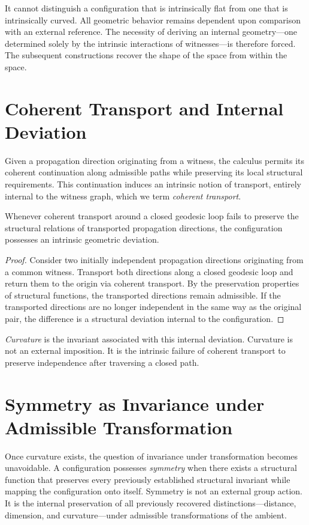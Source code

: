 \documentclass[12pt,anyside]{book}
\newcommand{\term}[1]{\textit{#1}}             %
\begin{document}
It cannot distinguish a configuration that is intrinsically flat from one that is intrinsically curved. All geometric behavior remains dependent upon comparison with an external reference. The necessity of deriving an internal geometry---one determined solely by the intrinsic interactions of witnesses---is therefore forced. The subsequent constructions recover the shape of the space from within the space.

\section{Coherent Transport and Internal Deviation}
Given a propagation direction originating from a witness, the calculus permits its coherent continuation along admissible paths while preserving its local structural requirements. This continuation induces an intrinsic notion of transport, entirely internal to the witness graph, which we term \term{coherent transport}.

\begin{theorem}
Whenever coherent transport around a closed geodesic loop fails to preserve the structural relations of transported propagation directions, the configuration possesses an intrinsic geometric deviation.
\end{theorem}

\begin{proof}
Consider two initially independent propagation directions originating from a common witness. Transport both directions along a closed geodesic loop and return them to the origin via coherent transport. By the preservation properties of structural functions, the transported directions remain admissible. If the transported directions are no longer independent in the same way as the original pair, the difference is a structural deviation internal to the configuration.
\end{proof}

\term{Curvature} is the invariant associated with this internal deviation. Curvature is not an external imposition. It is the intrinsic failure of coherent transport to preserve independence after traversing a closed path.

\section{Symmetry as Invariance under Admissible Transformation}
Once curvature exists, the question of invariance under transformation becomes unavoidable. A configuration possesses \term{symmetry} when there exists a structural function that preserves every previously established structural invariant while mapping the configuration onto itself. Symmetry is not an external group action. It is the internal preservation of all previously recovered distinctions---distance, dimension, and curvature---under admissible transformations of the ambient.
\end{document}
